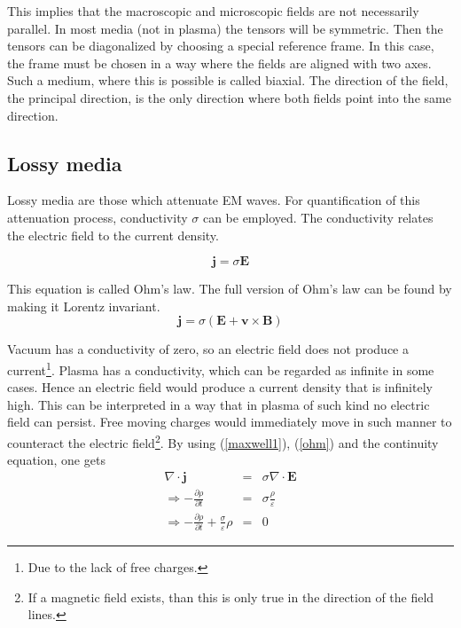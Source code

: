 \documentclass[a4paper,14pt]{extbook}
\begin{document}
This implies that the macroscopic and microscopic fields are not necessarily parallel. In most media (not in plasma) the tensors will be symmetric. Then the tensors can be diagonalized by choosing a special reference frame. In this case, the frame must be chosen in a way where the fields are aligned with two axes. Such a medium, where this is possible is called biaxial. The direction of the field, the principal direction, is the only direction where both fields point into the same direction.

\subsection{Lossy media}

Lossy media are those which attenuate EM waves. For quantification of this attenuation process, conductivity $\sigma$ can be employed. The conductivity relates the electric field to the current density.

\begin{equation}\label{ohm}
    \mathbf{j}=\sigma \mathbf{E}
\end{equation}


This equation is called Ohm's law. The full version of Ohm's law can be found by making it Lorentz invariant.\\

\begin{equation}\label{ohm_lorenz}
    \mathbf{j}=\sigma (\mathbf{E}+\mathbf{v} \times \mathbf{B})
\end{equation}

Vacuum has a conductivity of zero, so an electric field does not produce a current\footnote{Due to the lack of free charges.}. Plasma has a conductivity, which can be regarded as infinite in some cases. Hence an electric field would produce a current density that is infinitely high. This can be interpreted in a way that in plasma of such kind no electric field can persist. Free moving charges would immediately move in such manner to counteract the electric field\footnote{If a magnetic field exists, than this is only true in the direction of the field lines.}. By using (\ref{maxwell1}), (\ref{ohm}) and the continuity equation, one gets\\

\begin{eqnarray}
   \nabla \cdot \mathbf{j}&=&\sigma \nabla \cdot \mathbf{E}  \\
\Rightarrow -\frac{\partial \rho}{\partial t} &=& \sigma \frac{\rho}{\varepsilon}\\
\Rightarrow -\frac{\partial \rho}{\partial t} + \frac{\sigma}{\varepsilon}\rho &=& 0
\end{eqnarray}
\end{document}
